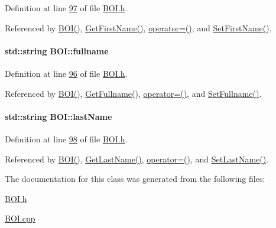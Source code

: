 Definition at line \hyperlink{_b_o_i_8h_source_l00097}{97} of file \hyperlink{_b_o_i_8h_source}{B\+O\+I.\+h}.



Referenced by \hyperlink{_b_o_i_8h_source_l00024}{B\+O\+I()}, \hyperlink{_b_o_i_8cpp_source_l00089}{Get\+First\+Name()}, \hyperlink{_b_o_i_8h_source_l00065}{operator=()}, and \hyperlink{_b_o_i_8cpp_source_l00085}{Set\+First\+Name()}.

\paragraph[{\texorpdfstring{fullname}{fullname}}]{\setlength{\rightskip}{0pt plus 5cm}std\+::string B\+O\+I\+::fullname\hspace{0.3cm}{\ttfamily [private]}}\hypertarget{class_b_o_i_a6d7c892a54bb6f7327cdc777081ab5f4_a6d7c892a54bb6f7327cdc777081ab5f4}{}\label{class_b_o_i_a6d7c892a54bb6f7327cdc777081ab5f4_a6d7c892a54bb6f7327cdc777081ab5f4}


Definition at line \hyperlink{_b_o_i_8h_source_l00096}{96} of file \hyperlink{_b_o_i_8h_source}{B\+O\+I.\+h}.



Referenced by \hyperlink{_b_o_i_8h_source_l00024}{B\+O\+I()}, \hyperlink{_b_o_i_8cpp_source_l00097}{Get\+Fullname()}, \hyperlink{_b_o_i_8h_source_l00065}{operator=()}, and \hyperlink{_b_o_i_8cpp_source_l00093}{Set\+Fullname()}.

\paragraph[{\texorpdfstring{last\+Name}{lastName}}]{\setlength{\rightskip}{0pt plus 5cm}std\+::string B\+O\+I\+::last\+Name\hspace{0.3cm}{\ttfamily [private]}}\hypertarget{class_b_o_i_ad51bfa6f28816c7f5036447ff809cecf_ad51bfa6f28816c7f5036447ff809cecf}{}\label{class_b_o_i_ad51bfa6f28816c7f5036447ff809cecf_ad51bfa6f28816c7f5036447ff809cecf}


Definition at line \hyperlink{_b_o_i_8h_source_l00098}{98} of file \hyperlink{_b_o_i_8h_source}{B\+O\+I.\+h}.



Referenced by \hyperlink{_b_o_i_8h_source_l00024}{B\+O\+I()}, \hyperlink{_b_o_i_8cpp_source_l00081}{Get\+Last\+Name()}, \hyperlink{_b_o_i_8h_source_l00065}{operator=()}, and \hyperlink{_b_o_i_8cpp_source_l00077}{Set\+Last\+Name()}.



The documentation for this class was generated from the following files\+:\begin{DoxyCompactItemize}
\item 
\hyperlink{_b_o_i_8h}{B\+O\+I.\+h}\item 
\hyperlink{_b_o_i_8cpp}{B\+O\+I.\+cpp}\end{DoxyCompactItemize}
